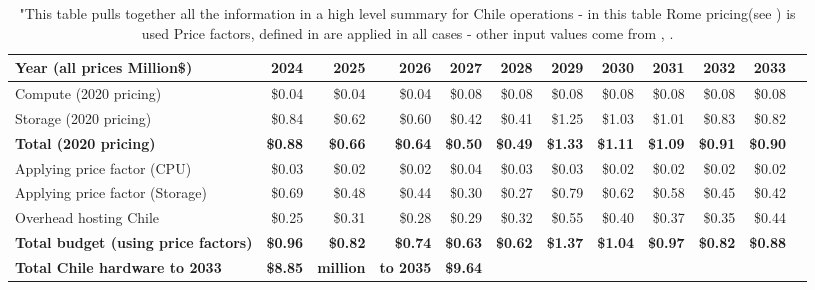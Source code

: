 \tiny \begin{longtable} { |p{}  |r  |r  |r  |r  |r  |r  |r  |r  |r  |r  |r |} 
\caption{"This table pulls together all the information in a high level summary 
for Chile operations - in this table Rome pricing(see 
) is used  Price factors, defined in 
 are applied in all cases - other input values come 
from , . \label{tab:opsChileR}}\\ 
\hline 
\textbf{Year  (all prices Million\$)}&\textbf{2024}&\textbf{2025}&\textbf{2026}&\textbf{2027}&\textbf{2028}&\textbf{2029}&\textbf{2030}&\textbf{2031}&\textbf{2032}&\textbf{2033} \\ \hline
{Compute (2020 pricing)}&{\$0.04}&{\$0.04}&{\$0.04}&{\$0.08}&{\$0.08}&{\$0.08}&{\$0.08}&{\$0.08}&{\$0.08}&{\$0.08} \\ \hline
{Storage (2020 pricing)}&{\$0.84}&{\$0.62}&{\$0.60}&{\$0.42}&{\$0.41}&{\$1.25}&{\$1.03}&{\$1.01}&{\$0.83}&{\$0.82} \\ \hline
\textbf{Total (2020 pricing)}&\textbf{\$0.88}&\textbf{\$0.66}&\textbf{\$0.64}&\textbf{\$0.50}&\textbf{\$0.49}&\textbf{\$1.33}&\textbf{\$1.11}&\textbf{\$1.09}&\textbf{\$0.91}&\textbf{\$0.90} \\ \hline
{Applying price factor (CPU)}&{\$0.03}&{\$0.02}&{\$0.02}&{\$0.04}&{\$0.03}&{\$0.03}&{\$0.02}&{\$0.02}&{\$0.02}&{\$0.02} \\ \hline
{Applying price factor (Storage)}&{\$0.69}&{\$0.48}&{\$0.44}&{\$0.30}&{\$0.27}&{\$0.79}&{\$0.62}&{\$0.58}&{\$0.45}&{\$0.42} \\ \hline
{Overhead hosting Chile}&{\$0.25}&{\$0.31}&{\$0.28}&{\$0.29}&{\$0.32}&{\$0.55}&{\$0.40}&{\$0.37}&{\$0.35}&{\$0.44} \\ \hline
\textbf{Total budget (using price factors)}&\textbf{\$0.96}&\textbf{\$0.82}&\textbf{\$0.74}&\textbf{\$0.63}&\textbf{\$0.62}&\textbf{\$1.37}&\textbf{\$1.04}&\textbf{\$0.97}&\textbf{\$0.82}&\textbf{\$0.88} \\ \hline
\textbf{Total Chile hardware to 2033}&\textbf{\$8.85}&\textbf{million}&\textbf{to 2035}&\textbf{\$9.64}&&&&&& \\ \hline
\end{longtable} \normalsize
